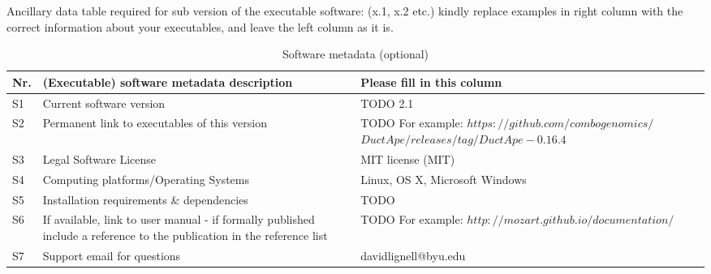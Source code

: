 \documentclass[preprint,12pt, a4paper]{elsarticle}
\begin{document}
Ancillary data table required for sub version of the executable software: (x.1, x.2 etc.) kindly replace examples in right column with the correct information about your executables, and leave the left column as it is.

\begin{table}[!h]
\begin{tabular}{|l|p{6.5cm}|p{6.5cm}|}
\hline
\textbf{Nr.} & \textbf{(Executable) software metadata description} & \textbf{Please fill in this column} \\
\hline
S1 & Current software version & TODO 2.1 \\
\hline
S2 & Permanent link to executables of this version  & TODO For example: $https://github.com/combogenomics/$ $DuctApe/releases/tag/DuctApe-0.16.4$ \\
\hline
S3 & Legal Software License & MIT license (MIT) \\
\hline
S4 & Computing platforms/Operating Systems & Linux, OS X, Microsoft Windows\\
\hline
S5 & Installation requirements \& dependencies & TODO \\
\hline
S6 & If available, link to user manual - if formally published include a reference to the publication in the reference
    list & TODO For example: $http://mozart.github.io/documentation/$ \\
\hline
S7 & Support email for questions & davidlignell@byu.edu \\
\hline
\end{tabular}
\caption{Software metadata (optional)}
\label{} 
\end{table}
\end{document}
